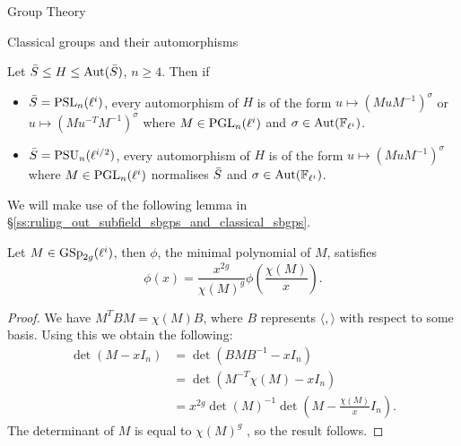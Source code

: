 \documentclass[11pt,a4paper]{article}
\newcommand{\Fli}{\mathbb{F}_{\ell^i}}
\begin{document}
\begin{section}{Group Theory}
\begin{subsection}{Classical groups and their automorphisms}



\begin{corollary}%
\label{cor_auts_of_almost_simple_groups}
Let $\Bar{S} \leq H \leq \Aut(\Bar{S})$, $n \geq 4$. Then if
\begin{itemize}
    \item $\Bar{S} = \PSL_n(\ell^i)$, every automorphism  of $H$ is of the form $u \mapsto (MuM^{-1})^{\sigma}$ or $u \mapsto (Mu^{-T}M^{-1})^{\sigma}$ where $M \in \PGL_n(\ell^i)$ and $\sigma \in \Aut(\Fli)$.
    \item $\Bar{S} = \PSU_n(\ell^{i/2})$, every automorphism of $H$ is of the form $u \mapsto (MuM^{-1})^{\sigma}$ where $M \in \PGL_n(\ell^i)$ normalises $\Bar{S}$ and $\sigma \in \Aut(\Fli)$.
\end{itemize}
\end{corollary}

We will make use of the following lemma in \S \ref{ss:ruling_out_subfield_sbgps_and_classical_sbgps}.

\begin{lemma}
\label{lemma_symplectic_characteristic_poly}
Let $M \in \GSp_{2g}(\ell^i)$, then $\phi$, the minimal polynomial of $M$, satisfies $$ \phi(x) = \frac{x^{2g}}{\chi(M)^g}\phi\left(\frac{\chi(M)}{x}\right).$$
\end{lemma}

\begin{proof}
We have $M^TBM=\chi(M)B$, where $B$ represents $\langle,\rangle$ with respect to some basis. Using this we obtain the following:
\begin{align*}
\det(M- x I_n)  & = \det(BMB^{-1} - x I_n) \\
 & = \det(M^{-T}\chi(M) - x I_n) \\
& = x^{2g}\det(M)^{-1}\det(M- \frac{\chi(M)}{x} I_n). %
\end{align*}
The determinant of $M$ is equal to $\chi(M)^g$ \cite[Lemma 2.4.5]{KleidmanLiebeck}, so the result follows.
\end{proof}


\end{subsection}
\end{section}
\end{document}
